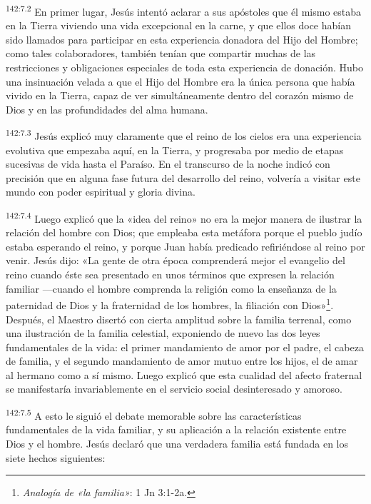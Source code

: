 \par
\textsuperscript{142:7.2} En primer lugar, Jesús intentó aclarar a sus apóstoles que él mismo estaba en la Tierra viviendo una vida excepcional en la carne, y que ellos doce habían sido llamados para participar en esta experiencia donadora del Hijo del Hombre; como tales colaboradores, también tenían que compartir muchas de las restricciones y obligaciones especiales de toda esta experiencia de donación. Hubo una insinuación velada a que el Hijo del Hombre era la única persona que había vivido en la Tierra, capaz de ver simultáneamente dentro del corazón mismo de Dios y en las profundidades del alma humana.

\par
\textsuperscript{142:7.3} Jesús explicó muy claramente que el reino de los cielos era una experiencia evolutiva que empezaba aquí, en la Tierra, y progresaba por medio de etapas sucesivas de vida hasta el Paraíso. En el transcurso de la noche indicó con precisión que en alguna fase futura del desarrollo del reino, volvería a visitar este mundo con poder espiritual y gloria divina.

\par
\textsuperscript{142:7.4} Luego explicó que la «idea del reino» no era la mejor manera de ilustrar la relación del hombre con Dios; que empleaba esta metáfora porque el pueblo judío estaba esperando el reino, y porque Juan había predicado refiriéndose al reino por venir. Jesús dijo: «La gente de otra época comprenderá mejor el evangelio del reino cuando éste sea presentado en unos términos que expresen la relación familiar ---cuando el hombre comprenda la religión como la enseñanza de la paternidad de Dios y la fraternidad de los hombres, la filiación con Dios»\footnote{\textit{Analogía de «la familia»}: 1 Jn 3:1-2a.}. Después, el Maestro disertó con cierta amplitud sobre la familia terrenal, como una ilustración de la familia celestial, exponiendo de nuevo las dos leyes fundamentales de la vida: el primer mandamiento de amor por el padre, el cabeza de familia, y el segundo mandamiento de amor mutuo entre los hijos, el de amar al hermano como a sí mismo. Luego explicó que esta cualidad del afecto fraternal se manifestaría invariablemente en el servicio social desinteresado y amoroso.

\par
\textsuperscript{142:7.5} A esto le siguió el debate memorable sobre las características fundamentales de la vida familiar, y su aplicación a la relación existente entre Dios y el hombre. Jesús declaró que una verdadera familia está fundada en los siete hechos siguientes:

